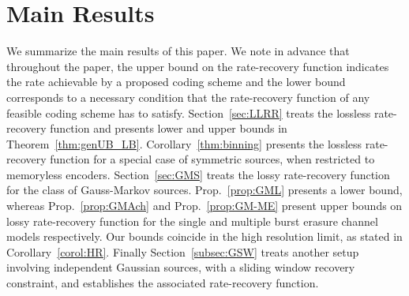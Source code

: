 \documentclass[journal, twocolumn, 10pt]{IEEEtran}
\newcommand{\bof}[1]{\textbf{#1}}
\begin{document}
%
%
%
%
%
%
%
%
%
%


\section{Main Results}
\label{sec:Results}
We summarize the main results of this paper. We note in advance that throughout the paper, the upper bound on the rate-recovery function indicates the rate achievable by a proposed coding scheme and the lower bound corresponds to a necessary condition that the rate-recovery function of any feasible coding scheme has to satisfy. Section~\ref{sec:LLRR} treats the lossless rate-recovery function and presents
lower and upper bounds in Theorem~\ref{thm:genUB_LB}. Corollary~\ref{thm:binning} presents the lossless rate-recovery function for a special case of symmetric sources, when restricted to memoryless encoders. Section~\ref{sec:GMS} treats the lossy rate-recovery function for the class of Gauss-Markov sources.  Prop.~\ref{prop:GML} presents a lower bound, whereas Prop.~\ref{prop:GMAch} and Prop.~\ref{prop:GM-ME} present upper bounds on lossy rate-recovery function for the single and multiple burst erasure channel models respectively. Our bounds coincide in the high resolution limit, as stated in Corollary~\ref{corol:HR}.  Finally Section~\ref{subsec:GSW} treats another setup involving  independent Gaussian sources, with a sliding window recovery constraint, and establishes the associated rate-recovery function.
\end{document}
